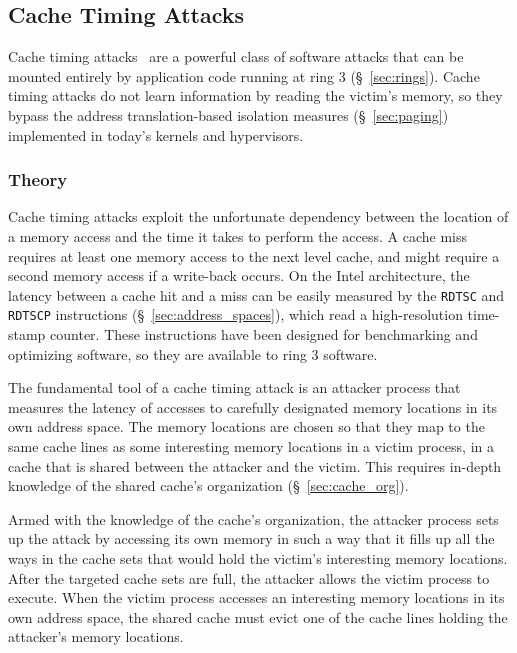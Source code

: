 \subsection{Cache Timing Attacks}
\label{sec:cache_timing}

Cache timing attacks~\cite{banescu2011cache} are a powerful class of software
attacks that can be mounted entirely by application code running at ring 3
(\S~\ref{sec:rings}). Cache timing attacks do not learn information by reading
the victim's memory, so they bypass the address translation-based isolation
measures (\S~\ref{sec:paging}) implemented in today's kernels and hypervisors.


\subsubsection{Theory}

Cache timing attacks exploit the unfortunate dependency between the location of
a memory access and the time it takes to perform the access. A cache miss
requires at least one memory access to the next level cache, and might require
a second memory access if a write-back occurs. On the Intel architecture, the
latency between a cache hit and a miss can be easily measured by the
\texttt{RDTSC} and \texttt{RDTSCP} instructions (\S~\ref{sec:address_spaces}),
which read a high-resolution time-stamp counter. These instructions have been
designed for benchmarking and optimizing software, so they are available to
ring 3 software.

The fundamental tool of a cache timing attack is an attacker process that
measures the latency of accesses to carefully designated memory locations in
its own address space. The memory locations are chosen so that they map to
the same cache lines as some interesting memory locations in a victim process,
in a cache that is shared between the attacker and the victim. This requires
in-depth knowledge of the shared cache's organization (\S~\ref{sec:cache_org}).

Armed with the knowledge of the cache's organization, the attacker process
sets up the attack by accessing its own memory in such a way that it fills up
all the ways in the cache sets that would hold the victim's interesting memory
locations. After the targeted cache sets are full, the attacker allows the
victim process to execute. When the victim process accesses an interesting
memory locations in its own address space, the shared cache must evict one of
the cache lines holding the attacker's memory locations.

